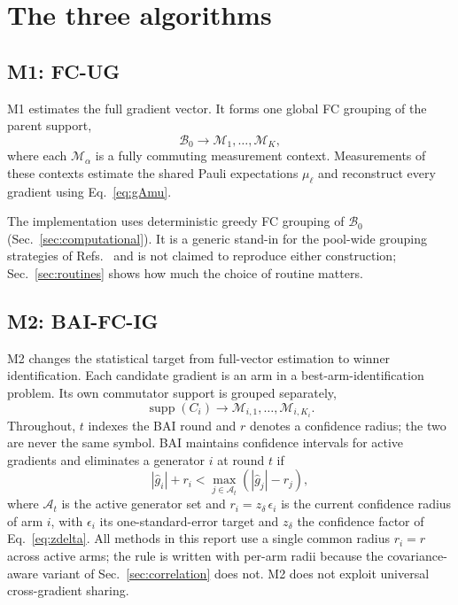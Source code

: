\documentclass[10pt]{article}
\newcommand{\supp}{\operatorname{supp}}
\begin{document}
\section{The three algorithms}
\label{sec:algorithms}

\subsection{M1: FC-UG}

M1 estimates the full gradient vector. It forms one global FC grouping of the parent support,
\begin{equation}
  \mathcal B_0 \longrightarrow \mathcal M_1,\ldots,\mathcal M_K,
\end{equation}
where each $\mathcal M_\alpha$ is a fully commuting measurement context. Measurements of these contexts estimate the shared Pauli expectations $\mu_\ell$ and reconstruct every gradient using Eq.~\eqref{eq:gAmu}.

The implementation uses deterministic greedy FC grouping of $\mathcal B_0$ (Sec.~\ref{sec:computational}). It is a generic stand-in for the pool-wide grouping strategies of Refs.~\cite{Anastasiou2023ReallyMeasure,Shkolnikov2023Avoiding} and is not claimed to reproduce either construction; Sec.~\ref{sec:routines} shows how much the choice of routine matters.

\subsection{M2: BAI-FC-IG}

M2 changes the statistical target from full-vector estimation to winner identification. Each candidate gradient is an arm in a best-arm-identification problem. Its own commutator support is grouped separately,
\begin{equation}
  \supp(C_i) \longrightarrow \mathcal M_{i,1},\ldots,\mathcal M_{i,K_i} .
\end{equation}
Throughout, $t$ indexes the BAI round and $r$ denotes a confidence radius; the two are never the same symbol. BAI maintains confidence intervals for active gradients and eliminates a generator $i$ at round $t$ if
\begin{equation}
  |\widehat g_i|+r_i < \max_{j\in\mathcal A_t}\left(|\widehat g_j|-r_j\right),
  \label{eq:bai-elim}
\end{equation}
where $\mathcal A_t$ is the active generator set and $r_i=z_\delta\,\epsilon_i$ is the current confidence radius of arm $i$, with $\epsilon_i$ its one-standard-error target and $z_\delta$ the confidence factor of Eq.~\eqref{eq:zdelta}. All methods in this report use a single common radius $r_i=r$ across active arms; the rule is written with per-arm radii because the covariance-aware variant of Sec.~\ref{sec:correlation} does not. M2 does not exploit universal cross-gradient sharing.
\end{document}
